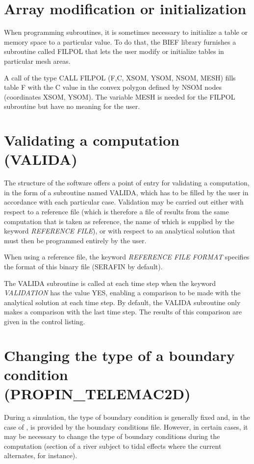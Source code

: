 \section{ Array modification or initialization}

 When programming  subroutines, it is sometimes necessary to initialize a table or memory space to a particular value. To do that, the BIEF library furnishes a subroutine called FILPOL that lets the user modify or initialize tables in particular mesh areas.

 A call of the type CALL FILPOL (F,C, XSOM, YSOM, NSOM, MESH) fills table F with the C value in the convex polygon defined by NSOM nodes (coordinates XSOM, YSOM). The variable MESH is needed for the FILPOL subroutine but have no meaning for the user.


\section{ Validating a computation (VALIDA) }

 The structure of the  software offers a point of entry for validating a computation, in the form of a subroutine named VALIDA, which has to be filled by the user in accordance with each particular case. Validation may be carried out either with respect to a reference file (which is therefore a file of results from the same computation that is taken as reference, the name of which is supplied by the keyword \textit{REFERENCE FILE}), or with respect to an analytical solution that must then be programmed entirely by the user.

 When using a reference file, the keyword \textit{REFERENCE FILE FORMAT} specifies the format of this binary file (SERAFIN by default).

 The VALIDA subroutine is called at each time step when the keyword \textit{VALIDATION} has the value YES, enabling a comparison to be made with the analytical solution at each time step. By default, the VALIDA subroutine only makes a comparison with the last time step. The results of this comparison are given in the control listing.


\section{ Changing the type of a boundary condition (PROPIN\_TELEMAC2D)}
\label{sec:chang:type:bc:propin}
 During a simulation, the type of boundary condition is generally fixed and, in the case of , is provided by the boundary conditions file. However, in certain cases, it may be necessary to change the type of boundary conditions during the computation (section of a river subject to tidal effects where the current alternates, for instance).

